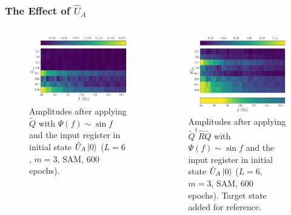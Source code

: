 \documentclass{beamer}
\begin{document}
\begin{frame}
\frametitle{The Effect of $\hat{U}_A$}
\begin{columns}
\begin{column}{0.5\textwidth}
\begin{figure}
\centering 
\includegraphics[width=\textwidth]{im/Q_amp_sine_UA}
\caption{Amplitudes after applying $\tilde{Q}$ with $\Psi(f) \sim \sin f$ and the input register in initial state $\hat{U}_A \ket{0}$ ($L=6$, $m=3$, SAM, 600 epochs). }
\end{figure}
\end{column}
\begin{column}{0.5\textwidth}
\begin{figure}
\centering 
\includegraphics[width=\textwidth]{im/QRQ_amp_sine_UA}
\caption{Amplitudes after applying $\tilde{Q}^\dagger \hat{R} \tilde{Q}$ with $\Psi(f) \sim \sin f$ and the input register in initial state $\hat{U}_A \ket{0}$ ($L=6$, $m=3$, SAM, 600 epochs). Target state added for reference.}
\end{figure}
\end{column}
\end{columns}
\end{frame}
\end{document}
